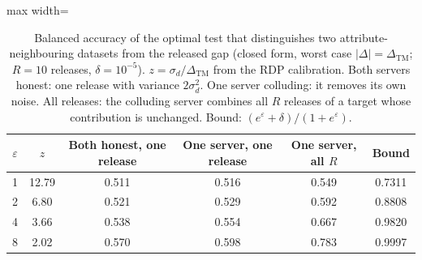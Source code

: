 \begin{table}[tbp]
\centering
\footnotesize
\caption{Balanced accuracy of the optimal test that distinguishes two attribute-neighbouring datasets from the released gap (closed form, worst case $|\Delta|=\Delta_{\mathrm{TM}}$; $R=10$ releases, $\delta=10^{-5}$). $z=\sigma_d/\Delta_{\mathrm{TM}}$ from the RDP calibration. Both servers honest: one release with variance $2\sigma_d^2$. One server colluding: it removes its own noise. All releases: the colluding server combines all $R$ releases of a target whose contribution is unchanged. Bound: $(e^{\varepsilon}+\delta)/(1+e^{\varepsilon})$.}
\label{tab:attack}
\begin{adjustbox}{max width=\textwidth}
\begin{tabular}{cccccc}
\toprule
$\varepsilon$ & $z$ & Both honest, one release & One server, one release & One server, all $R$ & Bound \\
\midrule
1 & 12.79 & 0.511 & 0.516 & 0.549 & 0.7311 \\
2 & 6.80 & 0.521 & 0.529 & 0.592 & 0.8808 \\
4 & 3.66 & 0.538 & 0.554 & 0.667 & 0.9820 \\
8 & 2.02 & 0.570 & 0.598 & 0.783 & 0.9997 \\
\bottomrule
\end{tabular}
\end{adjustbox}
\end{table}
